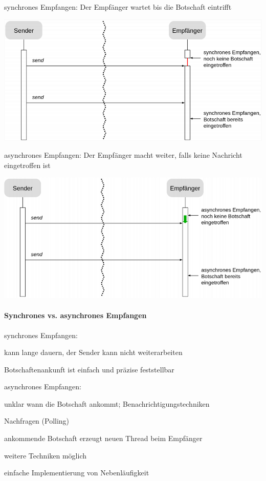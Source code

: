 \documentclass[10pt]{article}
\begin{document}
  \color{orange} synchrones Empfangen: \color{black} Der Empfänger wartet bis die Botschaft eintrifft
  \begin{center}
    \includegraphics[width=0.4\linewidth]{Assets/Programmierparadigmen-synchron-empfangen}
  \end{center}
  \color{orange} asynchrones Empfangen: \color{black} Der Empfänger macht weiter, falls keine Nachricht eingetroffen ist
  \begin{center}
    \includegraphics[width=0.4\linewidth]{Assets/Programmierparadigmen-asynchron-empfangen}
  \end{center}
  
  \paragraph{Synchrones vs. asynchrones Empfangen}
  \begin{itemize*}
    \item synchrones Empfangen:
    \begin{itemize*}
      \item kann lange dauern, der Sender kann nicht weiterarbeiten
      \item Botschaftenankunft ist einfach und präzise feststellbar
    \end{itemize*}
    \item asynchrones Empfangen:
    \begin{itemize*}
      \item unklar wann die Botschaft ankommt;
      \newline Benachrichtigungstechniken 
      \begin{itemize*}
        \item Nachfragen (Polling)
        \item ankommende Botschaft erzeugt neuen Thread beim Empfänger
        \item weitere Techniken möglich
      \end{itemize*}
      \item einfache Implementierung von Nebenläufigkeit
    \end{itemize*}
  \end{itemize*}
  
\end{document}
